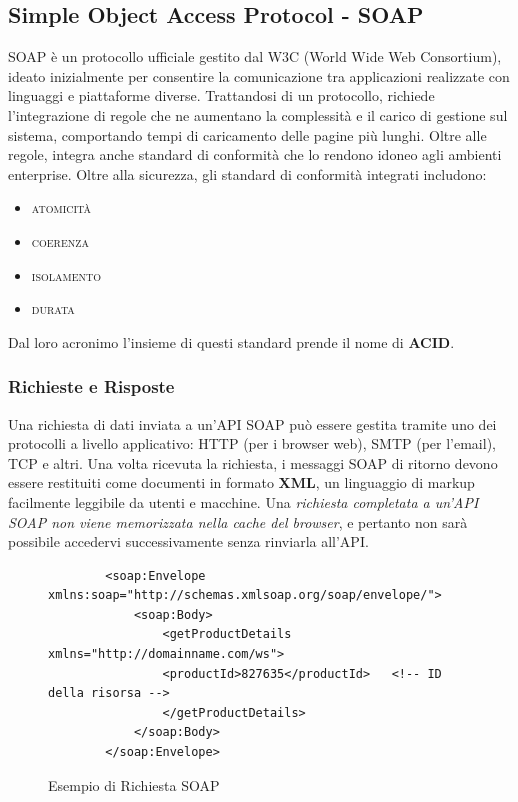 \subsection{Simple Object Access Protocol - SOAP}
SOAP è un protocollo ufficiale gestito dal W3C (World Wide Web Consortium), ideato inizialmente per consentire la comunicazione tra applicazioni realizzate con linguaggi e piattaforme diverse. Trattandosi di un protocollo, richiede l'integrazione di regole che ne aumentano la complessità e il carico di gestione sul sistema, comportando tempi di caricamento delle pagine più lunghi. Oltre alle regole, integra anche standard di conformità che lo rendono idoneo agli ambienti enterprise. Oltre alla sicurezza, gli standard di conformità integrati includono: 
\begin{itemize}
    \item \textsc{atomicità}
    \item \textsc{coerenza}
    \item \textsc{isolamento}
    \item \textsc{durata}
\end{itemize}
Dal loro acronimo l'insieme di questi standard prende il nome di \textbf{ACID}.

\subsubsection{Richieste e Risposte}
Una richiesta di dati inviata a un'API SOAP può essere gestita tramite uno dei protocolli a livello applicativo: HTTP (per i browser web), SMTP (per l'email), TCP e altri. Una volta ricevuta la richiesta, i messaggi SOAP di ritorno devono essere restituiti come documenti in formato \textbf{XML}, un linguaggio di markup facilmente leggibile da utenti e macchine. Una \textit{richiesta completata a un'API SOAP non viene memorizzata nella cache del browser}, e pertanto non sarà possibile accedervi successivamente senza rinviarla all'API.

\begin{figure}[H]
    \begin{verbatim}
        <soap:Envelope xmlns:soap="http://schemas.xmlsoap.org/soap/envelope/">
            <soap:Body>
                <getProductDetails xmlns="http://domainname.com/ws">
                <productId>827635</productId>   <!-- ID della risorsa -->
                </getProductDetails>
            </soap:Body>
        </soap:Envelope>
    \end{verbatim}
    \caption{Esempio di Richiesta SOAP}
    \label{fig:soaprequest}
\end{figure}


